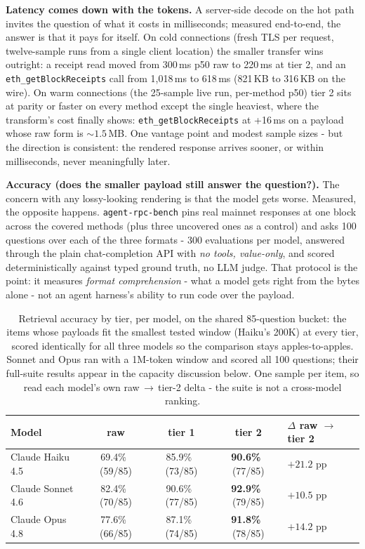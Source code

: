 \documentclass[11pt]{article}
\newcommand{\code}[1]{\texttt{#1}}
\begin{document}
\textbf{Latency comes down with the tokens.} A server-side decode on the hot path invites the question of what it costs in milliseconds; measured end-to-end, the answer is that it pays for itself. On cold connections (fresh TLS per request, twelve-sample runs from a single client location) the smaller transfer wins outright: a receipt read moved from 300\,ms p50 raw to 220\,ms at tier 2, and an \code{eth\_getBlockReceipts} call from 1{,}018\,ms to 618\,ms (821\,KB to 316\,KB on the wire). On warm connections (the 25-sample live run, per-method p50) tier 2 sits at parity or faster on every method except the single heaviest, where the transform's cost finally shows: \code{eth\_getBlockReceipts} at +16\,ms on a payload whose raw form is ${\sim}1.5$\,MB. One vantage point and modest sample sizes - but the direction is consistent: the rendered response arrives sooner, or within milliseconds, never meaningfully later.

\textbf{Accuracy (does the smaller payload still answer the question?).} The concern with any lossy-looking rendering is that the model gets worse. Measured, the opposite happens. \code{agent-rpc-bench} pins real mainnet responses at one block across the covered methods (plus three uncovered ones as a control) and asks 100 questions over each of the three formats - 300 evaluations per model, answered through the plain chat-completion API with \emph{no tools, value-only}, and scored deterministically against typed ground truth, no LLM judge. That protocol is the point: it measures \emph{format comprehension} - what a model gets right from the bytes alone - not an agent harness's ability to run code over the payload.

\begin{table}[h]
\centering\small
\renewcommand{\arraystretch}{1.15}
\begin{tabularx}{\textwidth}{@{}l c c c >{\raggedleft\arraybackslash}X@{}}
\toprule
\textbf{Model} & \textbf{raw} & \textbf{tier 1} & \textbf{tier 2} & \textbf{$\Delta$ raw $\to$ tier 2}\\
\midrule
Claude Haiku 4.5 & 69.4\% \,(59/85) & 85.9\% \,(73/85) & \textbf{90.6\%} \,(77/85) & $+21.2$ pp\\
Claude Sonnet 4.6 & 82.4\% \,(70/85) & 90.6\% \,(77/85) & \textbf{92.9\%} \,(79/85) & $+10.5$ pp\\
Claude Opus 4.8 & 77.6\% \,(66/85) & 87.1\% \,(74/85) & \textbf{91.8\%} \,(78/85) & $+14.2$ pp\\
\bottomrule
\end{tabularx}
\caption{Retrieval accuracy by tier, per model, on the shared 85-question bucket: the items whose payloads fit the smallest tested window (Haiku's 200K) at every tier, scored identically for all three models so the comparison stays apples-to-apples. Sonnet and Opus ran with a 1M-token window and scored all 100 questions; their full-suite results appear in the capacity discussion below. One sample per item, so read each model's own raw$\,\to\,$tier-2 delta - the suite is not a cross-model ranking.}
\end{table}
\end{document}
